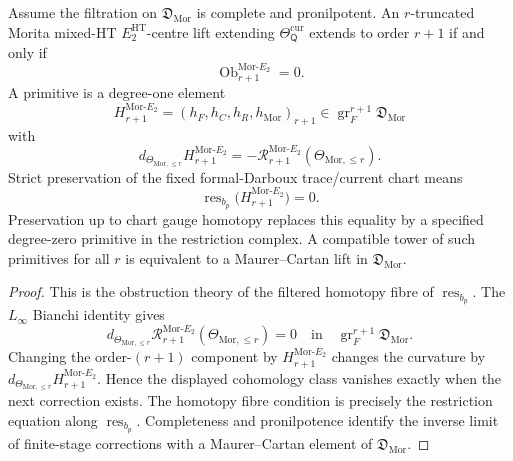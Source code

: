 \begin{prop}
\label{prop:relative-morita-e2-extension-criterion}
Assume the filtration on \(\mathfrak D_{\mathrm{Mor}}\) is complete and
pronilpotent.  An \(r\)-truncated Morita mixed-HT
\(E_2^{\mathrm{HT}}\)-centre lift extending
\(\Theta_{\mathsf Q}^{\mathrm{cur}}\) extends to order \(r+1\) if and
only if
\[
  \operatorname{Ob}^{\mathrm{Mor}\mbox{-}E_2}_{r+1}=0 .
\]
A primitive is a degree-one element
\[
  H^{\mathrm{Mor}\mbox{-}E_2}_{r+1}
  =
  (h_F,h_C,h_R,h_{\mathrm{Mor}})_{r+1}
  \in
  \operatorname{gr}^{r+1}_{F}\mathfrak D_{\mathrm{Mor}}
\]
with
\[
  d_{\Theta_{\mathrm{Mor},\le r}}
  H^{\mathrm{Mor}\mbox{-}E_2}_{r+1}
  =
  -\mathcal R^{\mathrm{Mor}\mbox{-}E_2}_{r+1}
  (\Theta_{\mathrm{Mor},\le r}).
\]
Strict preservation of the fixed formal-Darboux trace/current chart
means
\[
  \operatorname{res}_{b_p}
  \bigl(H^{\mathrm{Mor}\mbox{-}E_2}_{r+1}\bigr)=0 .
\]
Preservation up to chart gauge homotopy replaces this equality by a
specified degree-zero primitive in the restriction complex.  A
compatible tower of such primitives for all \(r\) is equivalent to a
Maurer--Cartan lift in \(\mathfrak D_{\mathrm{Mor}}\).
\end{prop}

\begin{proof}
This is the obstruction theory of the filtered homotopy fibre of
\(\operatorname{res}_{b_p}\).  The \(L_\infty\) Bianchi identity gives
\[
  d_{\Theta_{\mathrm{Mor},\le r}}
  \mathcal R^{\mathrm{Mor}\mbox{-}E_2}_{r+1}
  (\Theta_{\mathrm{Mor},\le r})=0
  \quad\text{in}\quad
  \operatorname{gr}^{r+1}_{F}\mathfrak D_{\mathrm{Mor}}.
\]
Changing the order-\((r+1)\) component by
\(H^{\mathrm{Mor}\mbox{-}E_2}_{r+1}\) changes the curvature by
\(d_{\Theta_{\mathrm{Mor},\le r}}
H^{\mathrm{Mor}\mbox{-}E_2}_{r+1}\).  Hence the displayed cohomology
class vanishes exactly when the next correction exists.  The homotopy
fibre condition is precisely the restriction equation along
\(\operatorname{res}_{b_p}\).  Completeness and pronilpotence identify
the inverse limit of finite-stage corrections with a Maurer--Cartan
element of \(\mathfrak D_{\mathrm{Mor}}\).
\end{proof}

